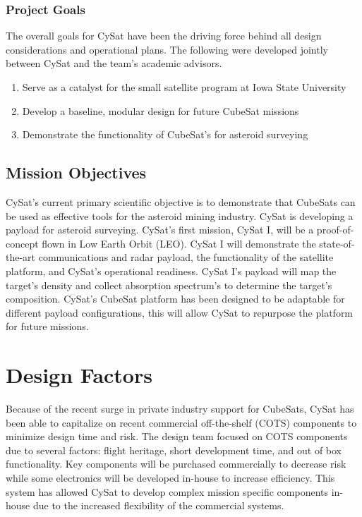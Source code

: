 \documentclass[nocover]            %
{CSLI}                       %
\begin{document}
\subsubsection{Project Goals}
The overall goals for CySat have been the driving force behind all design considerations and operational plans. The following were developed jointly between CySat and the team's academic advisors. 
\begin{enumerate}
\item Serve as a catalyst for the small satellite program at Iowa State University
\item Develop a baseline, modular design for future CubeSat missions
\item Demonstrate the functionality of CubeSat's for asteroid surveying 
\end{enumerate}

\subsection{Mission Objectives}
CySat's current primary scientific objective is to demonstrate that CubeSats can be used as effective tools for the asteroid mining industry. CySat is developing a payload for asteroid surveying. CySat's first mission, CySat I, will be a proof-of-concept flown in Low Earth Orbit (LEO). CySat I will demonstrate the state-of-the-art communications and radar payload, the functionality of the satellite platform, and CySat's operational readiness. CySat I's payload will map the target's density and collect absorption spectrum's to determine the target's composition. CySat's CubeSat platform has been designed to be adaptable for different payload configurations, this will allow CySat to repurpose the platform for future missions.

\section{Design Factors}
Because of the recent surge in private industry support for CubeSats, CySat has been able to capitalize on recent commercial off-the-shelf (COTS) components to minimize design time and risk. The design team focused on COTS components due to several factors: flight heritage, short development time, and out of box functionality. Key components will be purchased commercially to decrease risk while some electronics will be developed in-house to increase efficiency. This system has allowed CySat to develop complex mission specific components in-house due to the increased flexibility of the commercial systems.
\end{document}
